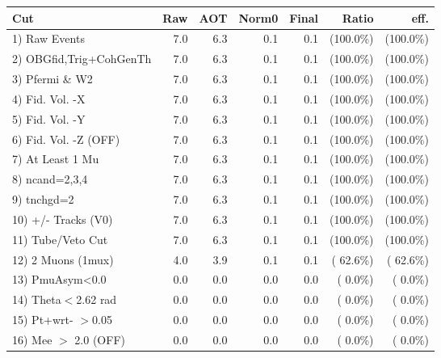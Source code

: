  \begin{table}[h!]\centering
 \begin{tabular}{||l||r|r|r|r|r|r||}
 \hline
 \hline
 Cut & Raw & AOT & Norm0 & Final & Ratio & eff.       \\
 \hline
  1) Raw Events           &          7.0 &          6.3 &          0.1 &          0.1 & (100.0\%) & (100.0\%) \\
  2) OBGfid,Trig+CohGenTh &          7.0 &          6.3 &          0.1 &          0.1 & (100.0\%) & (100.0\%) \\
  3) Pfermi \& W2         &          7.0 &          6.3 &          0.1 &          0.1 & (100.0\%) & (100.0\%) \\
  4) Fid. Vol. -X         &          7.0 &          6.3 &          0.1 &          0.1 & (100.0\%) & (100.0\%) \\
  5) Fid. Vol. -Y         &          7.0 &          6.3 &          0.1 &          0.1 & (100.0\%) & (100.0\%) \\
  6) Fid. Vol. -Z (OFF)   &          7.0 &          6.3 &          0.1 &          0.1 & (100.0\%) & (100.0\%) \\
  7) At Least 1 Mu        &          7.0 &          6.3 &          0.1 &          0.1 & (100.0\%) & (100.0\%) \\
  8) ncand=2,3,4          &          7.0 &          6.3 &          0.1 &          0.1 & (100.0\%) & (100.0\%) \\
  9) tnchgd=2             &          7.0 &          6.3 &          0.1 &          0.1 & (100.0\%) & (100.0\%) \\
 10) +/- Tracks (V0)      &          7.0 &          6.3 &          0.1 &          0.1 & (100.0\%) & (100.0\%) \\
 11) Tube/Veto Cut        &          7.0 &          6.3 &          0.1 &          0.1 & (100.0\%) & (100.0\%) \\
 12) 2 Muons (1mux)       &          4.0 &          3.9 &          0.1 &          0.1 & ( 62.6\%) & ( 62.6\%) \\
 13) PmuAsym<0.0          &          0.0 &          0.0 &          0.0 &          0.0 & (  0.0\%) & (  0.0\%) \\
 14) Theta$<$2.62 rad     &          0.0 &          0.0 &          0.0 &          0.0 & (  0.0\%) & (  0.0\%) \\
 15) Pt+wrt- $>$0.05      &          0.0 &          0.0 &          0.0 &          0.0 & (  0.0\%) & (  0.0\%) \\
 16) Mee $>$ 2.0  (OFF)   &          0.0 &          0.0 &          0.0 &          0.0 & (  0.0\%) & (  0.0\%) \\

\end{tabular}
\end{table}
